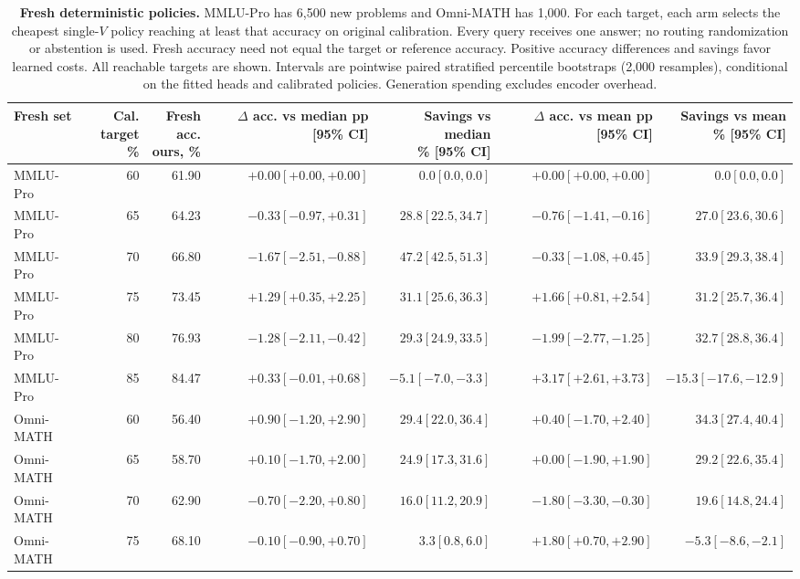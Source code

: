 \begin{table}[t]
\centering
\footnotesize
\setlength{\tabcolsep}{3pt}
\begin{tabular}{lrrrrrr}
\toprule
Fresh set & \shortstack{Cal. target\\\%} & \shortstack{Fresh acc.\\ours, \%} & \shortstack{$\Delta$ acc. vs median\\pp [95\% CI]} & \shortstack{Savings vs median\\\% [95\% CI]} & \shortstack{$\Delta$ acc. vs mean\\pp [95\% CI]} & \shortstack{Savings vs mean\\\% [95\% CI]} \\
\midrule
MMLU-Pro & 60 & 61.90 & $+0.00 [+0.00, +0.00]$ & $0.0 [0.0, 0.0]$ & $+0.00 [+0.00, +0.00]$ & $0.0 [0.0, 0.0]$ \\
MMLU-Pro & 65 & 64.23 & $-0.33 [-0.97, +0.31]$ & $28.8 [22.5, 34.7]$ & $-0.76 [-1.41, -0.16]$ & $27.0 [23.6, 30.6]$ \\
MMLU-Pro & 70 & 66.80 & $-1.67 [-2.51, -0.88]$ & $47.2 [42.5, 51.3]$ & $-0.33 [-1.08, +0.45]$ & $33.9 [29.3, 38.4]$ \\
MMLU-Pro & 75 & 73.45 & $+1.29 [+0.35, +2.25]$ & $31.1 [25.6, 36.3]$ & $+1.66 [+0.81, +2.54]$ & $31.2 [25.7, 36.4]$ \\
MMLU-Pro & 80 & 76.93 & $-1.28 [-2.11, -0.42]$ & $29.3 [24.9, 33.5]$ & $-1.99 [-2.77, -1.25]$ & $32.7 [28.8, 36.4]$ \\
MMLU-Pro & 85 & 84.47 & $+0.33 [-0.01, +0.68]$ & $-5.1 [-7.0, -3.3]$ & $+3.17 [+2.61, +3.73]$ & $-15.3 [-17.6, -12.9]$ \\
\midrule
Omni-MATH & 60 & 56.40 & $+0.90 [-1.20, +2.90]$ & $29.4 [22.0, 36.4]$ & $+0.40 [-1.70, +2.40]$ & $34.3 [27.4, 40.4]$ \\
Omni-MATH & 65 & 58.70 & $+0.10 [-1.70, +2.00]$ & $24.9 [17.3, 31.6]$ & $+0.00 [-1.90, +1.90]$ & $29.2 [22.6, 35.4]$ \\
Omni-MATH & 70 & 62.90 & $-0.70 [-2.20, +0.80]$ & $16.0 [11.2, 20.9]$ & $-1.80 [-3.30, -0.30]$ & $19.6 [14.8, 24.4]$ \\
Omni-MATH & 75 & 68.10 & $-0.10 [-0.90, +0.70]$ & $3.3 [0.8, 6.0]$ & $+1.80 [+0.70, +2.90]$ & $-5.3 [-8.6, -2.1]$ \\
\bottomrule
\end{tabular}
\caption{\textbf{Fresh deterministic policies.} MMLU-Pro has 6,500 new problems and Omni-MATH has 1,000. For each target, each arm selects the cheapest single-$V$ policy reaching at least that accuracy on original calibration. Every query receives one answer; no routing randomization or abstention is used. Fresh accuracy need not equal the target or reference accuracy. Positive accuracy differences and savings favor learned costs. All reachable targets are shown. Intervals are pointwise paired stratified percentile bootstraps (2,000 resamples), conditional on the fitted heads and calibrated policies. Generation spending excludes encoder overhead.}
\label{tab:fresh}
\end{table}
